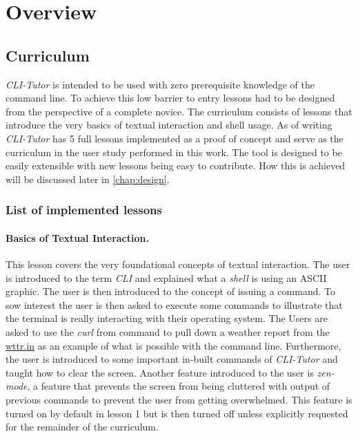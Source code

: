 \section{Overview}
\subsection{Curriculum}

\textit{CLI-Tutor} is intended to be used with zero prerequisite knowledge of
the command line. To achieve this low barrier to entry lessons had to be
designed from the perspective of a complete novice. The curriculum consists of
lessons that introduce the very basics of textual interaction and shell usage.
As of writing \textit{CLI-Tutor} has 5 full lessons implemented as a proof of
concept and serve as the curriculum in the user study performed in this work.
The tool is designed to be easily extensible with new lessons being easy to
contribute. How this is achieved will be discussed later in
\autoref{chap:design}.

\subsubsection{List of implemented lessons} 

\paragraph{Basics of Textual Interaction.} This lesson covers the very
foundational concepts of textual interaction. The user is introduced to the
term \textit{CLI} and explained what a \textit{shell} is using an ASCII
graphic. The user is then introduced to the concept of issuing a command. To
sow interest the user is then asked to execute some commands to illustrate that
the terminal is really interacting with their operating system. The Users are
asked to use the \textit{curl} from command to pull down a weather report from
the \url{wttr.in} as an example of what is possible with the command line.
Furthermore, the user is introduced to some important in-built commands
of \textit{CLI-Tutor} and taught how to clear the screen. Another feature
introduced to the user is \textit{zen-mode}, a feature that prevents the screen
from being cluttered with output of previous commands to prevent the user from
getting overwhelmed. This feature is turned on by default in lesson 1 but is
then turned off unless explicitly requested for the remainder of the curriculum.

